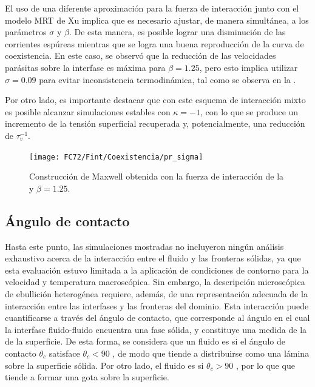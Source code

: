 El uso de una diferente aproximaci\'on para la fuerza de interacci\'on junto con el modelo MRT de Xu implica que es necesario ajustar, de manera simult\'anea, a los par\'ametros $\sigma$ y $\beta$. De esta manera, es posible lograr una disminuci\'on de las corrientes esp\'ureas mientras que se logra una buena reproducci\'on de la curva de coexistencia. En este caso, se observ\'o que la reducci\'on de las velocidades par\'asitas sobre la interfase es m\'axima para $\beta=1.25$, pero esto implica utilizar $\sigma=0.09$ para evitar inconsistencia termodin\'amica, tal como se observa en la .

Por otro lado, es importante destacar que con este esquema de interacci\'on mixto es posible alcanzar simulaciones estables con $\kappa=-1$, con lo que se produce un incremento de la tensi\'on superficial recuperada y, potencialmente, una reducci\'on de $\tau_v^{-1}$.

\begin{figure}[ht]
	\centering
	\texttt{[image: FC72/Fint/Coexistencia/pr\_sigma]}
	\caption{Construcci\'on de Maxwell obtenida con la fuerza de interacci\'on de la  y $\beta=1.25$.}
	\label{fig:pr_sigma_beta}
\end{figure}
\FloatBarrier



\subsection{\'Angulo de contacto}

Hasta este punto, las simulaciones mostradas no incluyeron ning\'un an\'alisis exhaustivo acerca de la interacci\'on entre el fluido y las fronteras s\'olidas, ya que esta evaluaci\'on estuvo limitada a la aplicaci\'on de condiciones de contorno para la velocidad y temperatura macrosc\'opica. Sin embargo, la descripci\'on microsc\'opica de ebullici\'on heterog\'enea requiere, adem\'as, de una representaci\'on adecuada de la interacci\'on entre las interfases y las fronteras del dominio. Esta interacci\'on puede cuantificarse a trav\'es del \'angulo de contacto, que corresponde al \'angulo en el cual la interfase fluido-fluido encuentra una fase s\'olida, y constituye una medida de la  de la superficie. De esta forma, se considera que un fluido es  si el \'angulo de contacto $\theta_c$ satisface $\theta_c < 90$ \textordmasculine, de modo que tiende a distribuirse como una l\'amina sobre la superficie s\'olida. Por otro lado, el fluido es  si $\theta_c > 90$ \textordmasculine, por lo que que tiende a formar una gota sobre la superficie.

